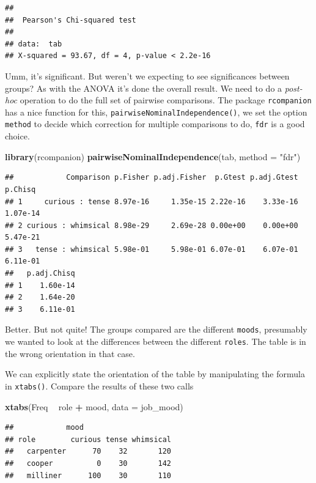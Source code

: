 \documentclass[
]{book}
\newenvironment{Shaded}{\begin{snugshade}}{\end{snugshade}}
\newcommand{\DataTypeTok}[1]{\textcolor[rgb]{0.13,0.29,0.53}{#1}}
\newcommand{\KeywordTok}[1]{\textcolor[rgb]{0.13,0.29,0.53}{\textbf{#1}}}
\newcommand{\NormalTok}[1]{#1}
\newcommand{\OperatorTok}[1]{\textcolor[rgb]{0.81,0.36,0.00}{\textbf{#1}}}
\newcommand{\StringTok}[1]{\textcolor[rgb]{0.31,0.60,0.02}{#1}}
\begin{document}
\begin{verbatim}
## 
## 	Pearson's Chi-squared test
## 
## data:  tab
## X-squared = 93.67, df = 4, p-value < 2.2e-16
\end{verbatim}

Umm, it's significant. But weren't we expecting to see significances between groups? As with the ANOVA it's done the overall result. We need to do a \emph{post-hoc} operation to do the full set of pairwise comparisons. The package \texttt{rcompanion} has a nice function for this, \texttt{pairwiseNominalIndependence()}, we set the option \texttt{method} to decide which correction for multiple comparisons to do, \texttt{fdr} is a good choice.

\begin{Shaded}
\begin{Highlighting}[]
\KeywordTok{library}\NormalTok{(rcompanion)}
\KeywordTok{pairwiseNominalIndependence}\NormalTok{(tab, }\DataTypeTok{method =} \StringTok{"fdr"}\NormalTok{)}
\end{Highlighting}
\end{Shaded}

\begin{verbatim}
##            Comparison p.Fisher p.adj.Fisher  p.Gtest p.adj.Gtest  p.Chisq
## 1     curious : tense 8.97e-16     1.35e-15 2.22e-16    3.33e-16 1.07e-14
## 2 curious : whimsical 8.98e-29     2.69e-28 0.00e+00    0.00e+00 5.47e-21
## 3   tense : whimsical 5.98e-01     5.98e-01 6.07e-01    6.07e-01 6.11e-01
##   p.adj.Chisq
## 1    1.60e-14
## 2    1.64e-20
## 3    6.11e-01
\end{verbatim}

Better. But not quite! The groups compared are the different \texttt{moods}, presumably we wanted to look at the differences between the different \texttt{roles}. The table is in the wrong orientation in that case.

We can explicitly state the orientation of the table by manipulating the formula in \texttt{xtabs()}. Compare the results of these two calls

\begin{Shaded}
\begin{Highlighting}[]
\KeywordTok{xtabs}\NormalTok{(Freq }\OperatorTok{~}\StringTok{ }\NormalTok{role }\OperatorTok{+}\StringTok{ }\NormalTok{mood, }\DataTypeTok{data =}\NormalTok{ job_mood)}
\end{Highlighting}
\end{Shaded}

\begin{verbatim}
##            mood
## role        curious tense whimsical
##   carpenter      70    32       120
##   cooper          0    30       142
##   milliner      100    30       110
\end{verbatim}
\end{document}
